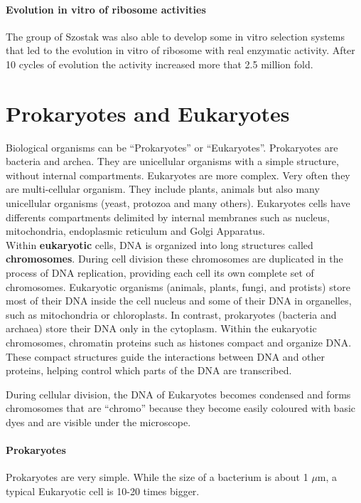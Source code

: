 \paragraph*{Evolution in vitro of ribosome activities}
The group of Szostak was also able to develop some in vitro selection systems
that led to the evolution in vitro of ribosome with real enzymatic activity.
After 10 cycles of evolution the activity increased more that 2.5 million fold.

\section{Prokaryotes and Eukaryotes}

Biological organisms can be ``Prokaryotes'' or ``Eukaryotes''. Prokaryotes are
bacteria and archea. They are unicellular organisms with a simple structure,
without internal compartments. Eukaryotes are more complex. Very often they are
multi-cellular organism. They include plants, animals but also many unicellular
organisms (yeast, protozoa and many others). Eukaryotes cells have differents
compartments delimited by internal membranes such as nucleus, mitochondria,
endoplasmic reticulum and Golgi Apparatus.\\

Within \textbf{eukaryotic} cells, DNA is organized into long structures called
\textbf{chromosomes}.
During cell division these chromosomes are duplicated in the process of DNA
replication, providing each cell its own complete set of chromosomes.
Eukaryotic organisms (animals, plants, fungi, and protists) store most of
their DNA inside the cell nucleus and some of their DNA in organelles, such as
mitochondria or chloroplasts.
In contrast, prokaryotes (bacteria and archaea) store their DNA only in the
cytoplasm.
Within the eukaryotic chromosomes, chromatin proteins such as histones compact
and organize DNA.
These compact structures guide the interactions between DNA and other proteins,
helping control which parts of the DNA are transcribed.

During cellular division, the DNA
of Eukaryotes becomes condensed and forms chromosomes that are ``chromo''
because they become easily coloured with basic dyes and are visible under the
microscope.

\paragraph*{Prokaryotes} Prokaryotes are very simple. While the size of a
bacterium is about 1 $\mu$m, a typical Eukaryotic cell is 10-20 times bigger.

